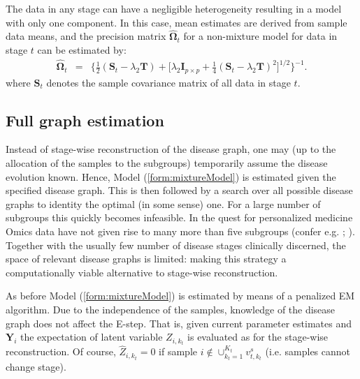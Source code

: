 \documentclass[10pt]{article}
\newcommand{\red}[1]{{\textcolor {red} {#1}}}
\begin{document}
The data in any stage can have a negligible heterogeneity resulting in a model with only one component. In this case, mean estimates are derived from sample data means, and the precision matrix $\widehat{\mathbf{\Omega}}_t$ for a non-mixture model for data in stage $t$ can be estimated by:
\begin{eqnarray}
\widehat{\mathbf{\Omega}}_t & = & \Big\{ \frac{1}{2} ( \mathbf{S}_t  - \lambda_2 \mathbf{T} ) + \Big[\lambda_2 \mathbf{I}_{p \times p} + \frac{1}{4} (\mathbf{S}_t - \lambda_2 \mathbf{T})^2 \Big]^{1/2}  \Big\}^{-1}.
\end{eqnarray}
where $\mathbf{S}_t$ denotes the sample covariance matrix of all data in stage $t$.


\subsection{Full graph estimation}\label{sec:fullgraph}
Instead of stage-wise reconstruction of the disease graph, one may (up to the allocation of the samples to the subgroups) temporarily assume the disease evolution known. Hence, Model (\ref{form:mixtureModel}) is estimated given the specified disease graph. This is then followed by a search over all possible disease graphs to identity the optimal (in some sense) one. For a large number of subgroups this quickly becomes infeasible. In the quest for personalized medicine Omics data have not given rise to many more than five subgroups (confer e.g. \citealp{Per2000}; \citealp{Sorl2001}). Together with the usually few number of disease stages clinically discerned, the space of relevant disease graphs is limited: making this strategy a computationally viable alternative to stage-wise reconstruction.

As before Model (\ref{form:mixtureModel}) is estimated by means of a penalized EM algorithm. Due to the independence of the samples, knowledge of the disease graph does not affect the E-step. That is, given current parameter estimates and $\mathbf{Y}_i$ the expectation of latent variable $Z_{i, k_t}$ is evaluated as for the stage-wise reconstruction. Of course, $\hat{Z}_{i, k_t} = 0$ if sample $i \not\in \cup_{k_t=1}^{K_t} v_{t, k_t}^s$ (i.e. samples cannot change stage).
\end{document}
